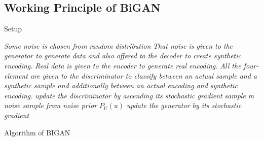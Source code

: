\documentclass[runningheads]{llncs}
\begin{document}
\subsection{Working Principle of BiGAN}
\begin{algorithm*}[H]
\caption{Setup}
\label{algo:pre}
\begin{algorithmic}[1]
    
            \STATE \emph{Some noise is chosen from random distribution}
            \STATE \emph{That noise is given to the generator to generate data
 and also offered to the decoder to create synthetic encoding.}
            \STATE \emph{Real data is given to the encoder to generate real encoding.}
            \STATE \emph{All the four-element are given to the discriminator to classify between an actual sample and a synthetic sample and additionally between an actual encoding and synthetic encoding.
 }
            \STATE \emph{update the discriminator by ascending its stochastic gradient}
        \ENDFOR
        \STATE \emph{sample m noise sample from noise prior ${P_U(u)}$}
        \STATE \emph{update the generator by its stochastic gradient}
    \ENDFOR
    
 \caption{Algorithm of BIGAN}    
\end{algorithmic}
\end{algorithm*}
\end{document}

